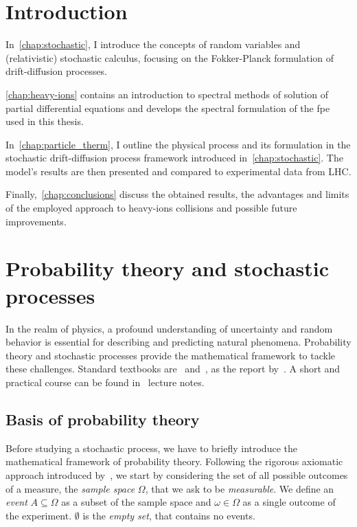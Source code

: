 \documentclass[a4paper,12pt]{book}
\newcommand{\Autoref}[1]{%
  \begingroup%
  \def\chapterautorefname{Chapter}%
  \def\sectionautorefname{Section}%
  \def\subsectionautorefname{Subsection}%
  \autoref{#1}%
  \endgroup%
}
\begin{document}






\tableofcontents
\printglossary[type=\acronymtype]


\chapter{Introduction}

In~\autoref{chap:stochastic}, I introduce the concepts of random variables and (relativistic) stochastic calculus, focusing on the Fokker-Planck formulation of drift-diffusion processes. 

\Autoref{chap:heavy-ions} contains an introduction to spectral methods of solution of partial differential equations and develops the spectral formulation of the \acrshort{fpe} used in this thesis.

In~\autoref{chap:particle_therm}, I outline the physical process and its formulation in the stochastic drift-diffusion process framework introduced in~\autoref{chap:stochastic}.
The model's results are then presented and compared to experimental data from LHC.

Finally,~\autoref{chap:conclusions} discuss the obtained results, the advantages and limits of the employed approach to heavy-ions collisions and possible future improvements.


\chapter{Probability theory and stochastic processes}\label{chap:stochastic}
In the realm of physics, a profound understanding of uncertainty and random behavior is essential for describing and predicting natural phenomena. Probability theory and stochastic processes provide the mathematical framework to tackle these challenges. %
Standard textbooks are~\textcite{gardiner2009stochastic} and~\textcite{pavliotis2014stochastic}, as the report by~\textcite{HANGGI1982207}. A short and practical course can be found in~\textcite{Schwarz19} lecture notes.

\section{Basis of probability theory}

Before studying a stochastic process, we have to briefly introduce the mathematical framework of probability theory. Following the rigorous axiomatic approach introduced by~\textcite{kolmogorov1933}, we start by considering the set of all possible outcomes of a measure, the \textit{sample space} $\Omega$, that we ask to be \textit{measurable}. We define an \textit{event} $A \subseteq \Omega$ as a subset of the sample space and $\omega \in \Omega$ as a single outcome of the experiment. $\emptyset$ is the \textit{empty set}, that contains no events.
\end{document}
